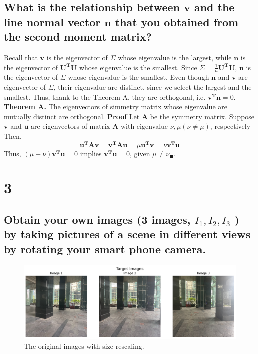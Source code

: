 \documentclass[10pt]{article}
\begin{document}
\subsection*{What is the relationship between $\mathbf{v}$ and the line normal vector $\mathbf{n}$ that you obtained from the second moment matrix?}
Recall that $\mathbf{v}$ is the eigenvector of $\Sigma$ whose eigenvalue is the largest, while $\mathbf{n}$ is the eigenvector of $\mathbf{U^TU}$ whose eigenvalue is the smallest. 
Since $\Sigma = \frac{1}{n}\mathbf{U^TU}$, $\mathbf{n}$ is the eigenvector of $\Sigma$ whose eigenvalue is the smallest. 
Even though $\mathbf{n}$ and $\mathbf{v}$ are eigenvector of $\Sigma$, their eigenvalue are distinct, since we select the largest and the smallest. Thus, thank to the Theorem A, they are orthogonal, i.e. $\mathbf{v^Tn} = 0$.\\
\noindent
\textbf{Theorem A.}
The eigenvectors of simmetry matrix whose eigenvalue are mutually distinct are orthogonal.
\textbf{Proof}
Let $\mathbf{A}$ be the symmetry matrix. Suppose $\mathbf{v}$ and $\mathbf{u}$ are eigenvectors of matrix $\mathbf{A}$ with eigenvalue $\nu, \mu(\nu \neq \mu)$, respectively
Then, 
\begin{equation*}
    \mathbf{u^TAv} = \mathbf{v^TAu} = \mu \mathbf{u^Tv} = \nu \mathbf{v^Tu}
\end{equation*}
Thus, $(\mu - \nu) \mathbf{v^Tu} = 0$ implies $\mathbf{v^Tu} = 0$, given $\mu \neq \nu_\blacksquare$.

\section*{3}
\subsection*{Obtain your own images (3 images, $I_1, I_2, I_3$ ) by taking pictures of a scene in different
views by rotating your smart phone camera. }
\begin{figure}[!h]
    \begin{center}
        \includegraphics*[scale = 0.35]{./fig/fig2}
    \end{center}
    \caption{The original images with size rescaling.}
\end{figure}
\end{document}
